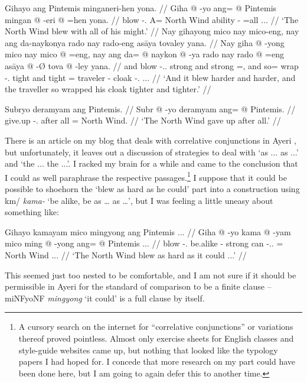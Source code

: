 \documentclass[12pt,paper=a4]{scrartcl}
\newcommand{\ques}{\fakesuperscript{?}} %
\newcommand{\xayr}[3]{{\Tagati #1} \emph{#2} \enquote*{#3}}
\begin{document}
\pex %
\a \begingl
	\glpreamble Gihayo ang Pintemis minganeri-hen yona. //
	\gla Giha @ -yo ang= @ Pintemis mingan @ -eri @ =hen yona. //
	\glb blow -\Tsg{}.\N{} A= {North Wind} ability -\Ins{} =all \Tsg{}.\N{}.\Gen{}. //
	\glft `The North Wind blew with all of his might.' //
\endgl
\a \begingl
	\glpreamble Nay gihayong mico nay mico-eng, nay ang da-naykonya rado nay rado-eng asāya tovaley yana. //
	\gla Nay giha @ -yong mico nay mico @ =eng, nay ang da= @ naykon @ -ya rado nay rado @ =eng asāya @ -Ø tova @ -ley yana. //
	\glb and blow -\Tsg.\N{}.\Aarg{} strong and strong =\Comp{}, and \AgtT{} so= wrap -\Tsg{}.\M{} tight and tight =\Comp{} traveler -\Top{} cloak -\Parg{}.\Inan{} \Tsg{}.\M{}.\Gen{}. //
	\glft `And it blew harder and harder, and the traveller so wrapped his cloak tighter and tighter.' //
\endgl

\a \begingl
	\glpreamble Subryo deramyam ang Pintemis. //
	\gla Subr @ -yo deramyam ang= @ Pintemis. //
	\glb give.up -\Tsg{}.\N{} {after all} \Aarg{}= {North Wind}. //
	\glft `The North Wind gave up after all.' //
\endgl
\xe

There is an article on my blog that deals with correlative conjunctions in Ayeri \autocite{becker2012}, but unfortunately, it leaves out a discussion of strategies to deal with `as ... as ...' and `the ... the ...'. I racked my brain for a while and came to the conclusion that I could as well paraphrase the respective passages.\footnote{A cursory search on the internet for \enquote{correlative conjunctions} or variations thereof proved pointless. Almost only exercise sheets for English classes and style-guide websites came up, but nothing that looked like the typology papers I had hoped for. I concede that more research on my part could have been done here, but I am going to again defer this to another time.} I suppose that it could be possible to shoehorn the `blew as hard as he could' part into a construction using \xayr{km/}{kama-}{be alike, be as … as …}, but I was feeling a little uneasy about something like:

\ex[exno=iii]
\begingl
	\glpreamble \judge\ques{}Gihayo kamayam mico mingyong ang Pintemis ... //
	\gla Giha @ -yo kama @ -yam mico ming @ -yong ang= @ Pintemis ... //
	\glb blow -\Tsg{}.\N{} be.alike -\Ptcp{} strong can -\Tsg{}.\N{}.\Aarg{} \Aarg{}= {North Wind} ... //
	\glft `The North Wind blew as hard as it could ...' //
\endgl
\xe

This seemed just too nested to be comfortable, and I am not sure if it should be permissible in Ayeri for the standard of comparison to be a finite clause -- \xayr{miNFyoNF}{mingyong}{it could} is a full clause by itself.
\end{document}
